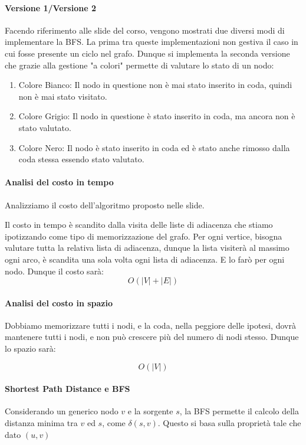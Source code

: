 \documentclass{article}
\begin{document}
\paragraph{Versione 1/Versione 2}

Facendo riferimento alle slide del corso, vengono mostrati due diversi modi di implementare la BFS. La prima tra queste implementazioni non gestiva il caso in cui fosse presente un ciclo nel grafo. Dunque si implementa la seconda versione che grazie alla gestione "a colori" permette di valutare lo stato di un nodo:

\begin{enumerate}
    \item Colore Bianco: Il nodo in questione non è mai stato inserito in coda, quindi non è mai stato visitato.
    \item Colore Grigio: Il nodo in questione è stato inserito in coda, ma ancora non è stato valutato.
    \item Colore Nero: Il nodo è stato inserito in coda ed è stato anche rimosso dalla coda stessa essendo stato valutato.
\end{enumerate}

\newpage

\paragraph{Analisi del costo in tempo} Analizziamo il costo dell'algoritmo proposto nelle slide.

Il costo in tempo è scandito dalla visita delle liste di adiacenza che stiamo ipotizzando come tipo di memorizzazione del grafo. Per ogni vertice, bisogna valutare tutta la relativa lista di adiacenza, dunque la lista visiterà al massimo ogni arco, è scandita una sola volta ogni lista di adiacenza. E lo farò per ogni nodo. Dunque il costo sarà: 
\[O(|V|+|E|)\]

\paragraph{Analisi del costo in spazio} Dobbiamo memorizzare tutti i nodi, e la coda, nella peggiore delle ipotesi, dovrà mantenere tutti i nodi, e non può crescere più del numero di nodi stesso. Dunque lo spazio sarà:

\begin{equation}
    O(|V|)
\end{equation}

\paragraph{Shortest Path Distance e BFS} Considerando un generico nodo $v$ e la sorgente $s$, la BFS permette il calcolo della distanza minima tra $v$ ed $s$, come $\delta(s,v)$. Questo si basa sulla proprietà tale che dato $(u,v)$
\end{document}
